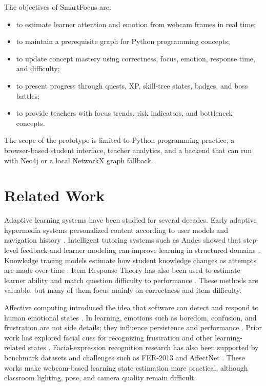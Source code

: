 \documentclass[conference]{IEEEtran}
\begin{document}
The objectives of SmartFocus are:
\begin{itemize}
  \item to estimate learner attention and emotion from webcam frames in real time;
  \item to maintain a prerequisite graph for Python programming concepts;
  \item to update concept mastery using correctness, focus, emotion, response time, and difficulty;
  \item to present progress through quests, XP, skill-tree states, badges, and boss battles;
  \item to provide teachers with focus trends, risk indicators, and bottleneck concepts.
\end{itemize}

The scope of the prototype is limited to Python programming practice, a browser-based student interface, teacher analytics, and a backend that can run with Neo4j or a local NetworkX graph fallback.

\section{Related Work}

Adaptive learning systems have been studied for several decades. Early adaptive hypermedia systems personalized content according to user models and navigation history \cite{brusilovsky1996methods}. Intelligent tutoring systems such as Andes showed that step-level feedback and learner modeling can improve learning in structured domains \cite{vanlehn2005andes}. Knowledge tracing models estimate how student knowledge changes as attempts are made over time \cite{corbett1994knowledge}. Item Response Theory has also been used to estimate learner ability and match question difficulty to performance \cite{lord1980irt}. These methods are valuable, but many of them focus mainly on correctness and item difficulty.

Affective computing introduced the idea that software can detect and respond to human emotional states \cite{picard1997affective}. In learning, emotions such as boredom, confusion, and frustration are not side details; they influence persistence and performance \cite{dmello2012dynamics}. Prior work has explored facial cues for recognizing frustration and other learning-related states \cite{grafsgaard2013recognizing}. Facial-expression recognition research has also been supported by benchmark datasets and challenges such as FER-2013 and AffectNet \cite{goodfellow2013challenges,mollahosseini2017affectnet}. These works make webcam-based learning state estimation more practical, although classroom lighting, pose, and camera quality remain difficult.
\end{document}
